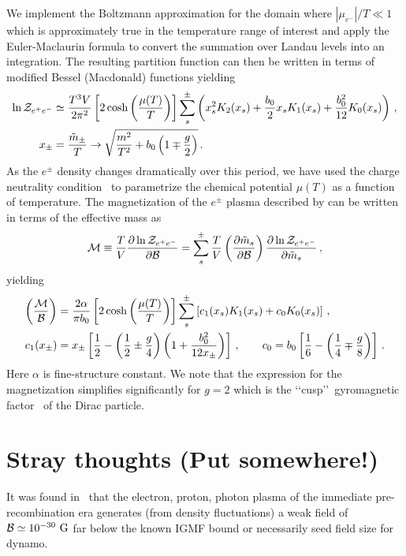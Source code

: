\documentclass[a4paper]{article}
\begin{document}
We implement the Boltzmann approximation for the domain where $|\mu_{e^{-}}|/T\ll1$ which is approximately true in the temperature range of interest and apply the Euler-Maclaurin formula to convert the summation over Landau levels into an integration. The resulting partition function can then be written in terms of modified Bessel (Macdonald) functions yielding
\begin{align}
    \label{partitionfinal}
    \ln{\cal Z}_{e^{+}e^{-}}&\simeq\frac{T^{3}V}{2\pi^{2}}\left[2\cosh\left(\frac{\mu(T)}{T}\right)\right]\sum_{s}^{\pm}\left(x_{s}^{2}K_{2}(x_{s})+\frac{b_{0}}{2}x_{s}K_{1}(x_{s})+\frac{b_{0}^{2}}{12}K_{0}(x_{s})\right)\,,\\
    x_{\pm}&=\frac{{\tilde m}_{\pm}}{T}\rightarrow\sqrt{\frac{m^{2}}{T^{2}}+b_{0}\left(1\mp\frac{g}{2}\right)}\,.
\end{align}
As the $e^{\pm}$ density changes dramatically over this period, we have used the charge neutrality condition~\cite{rafelski2023short} to parametrize the chemical potential $\mu(T)$ as a function of temperature. The magnetization of the $e^{\pm}$ plasma described by  can be written in terms of the effective mass as
\begin{align}
    \label{definemagetization}
    {\cal M}\equiv\frac{T}{V}\frac{\partial\ln{{\cal Z}_{e^{+}e^{-}}}}{\partial{\cal B}}=\sum_{s}^{\pm}\frac{T}{V}\left(\frac{\partial{\tilde m}_{s}}{\partial{\cal B}}\right)\frac{\partial\ln{{\cal Z}_{e^{+}e^{-}}}}{\partial{\tilde m}_{s}}\,,
\end{align}
yielding
\begin{align}
    \label{magnetization}
    \left(\frac{\cal M}{\cal B}\right)&=\frac{2\alpha}{\pi b_{0}}\left[2\cosh\left(\frac{\mu(T)}{T}\right)\right]\sum_{s}^{\pm}\left[c_{1}(x_{s})K_{1}(x_{s})+c_{0}K_{0}(x_{s})\right]\,,\\
    c_{1}(x_{\pm})&=x_{\pm}\left[\frac{1}{2}-\left(\frac{1}{2}\pm\frac{g}{4}\right)\left(1+\frac{b_{0}^{2}}{12x_{\pm}}\right)\right]\,,\qquad c_{0}=b_{0}\left[\frac{1}{6}-\left(\frac{1}{4}\mp\frac{g}{8}\right)\right]\,.
\end{align}
Here $\alpha$ is fine-structure constant. We note that the expression for the magnetization simplifies significantly for $g=2$ which is the \lq\lq cusp\rq\rq\ gyromagnetic factor~\cite{rafelski2022study} of the Dirac particle.

\section{Stray thoughts (Put somewhere!)}

It was found in~\cite{gopal2004generation} that the electron, proton, photon plasma of the immediate pre-recombination era generates (from density fluctuations) a weak field of ${\cal B}\simeq10^{-30}{\rm\ G}$ far below the known IGMF bound or necessarily seed field size for dynamo.




\end{document}

